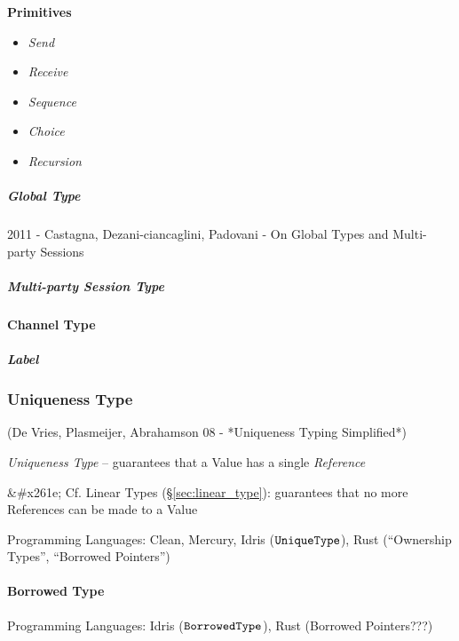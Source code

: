 \textbf{Primitives}

\begin{itemize}
  \item \emph{Send}
  \item \emph{Receive}
  \item \emph{Sequence}
  \item \emph{Choice}
  \item \emph{Recursion}
\end{itemize}



\subparagraph{Global Type}\label{sec:global_type}\hfill

2011 - Castagna, Dezani-ciancaglini, Padovani - On Global Types and
Multi-party Sessions %



\subparagraph{Multi-party Session Type}
\label{sec:multiparty_session}\hfill



\paragraph{Channel Type}\label{sec:channel_type}\hfill

\subparagraph{Label}\label{sec:channel_label}\hfill



\subsubsection{Uniqueness Type}\label{sec:uniqueness_type}

(De Vries, Plasmeijer, Abrahamson 08 - *Uniqueness Typing Simplified*)

\emph{Uniqueness Type} -- guarantees that a Value has a single
\emph{Reference}

&#x261e; Cf. Linear Types (\S\ref{sec:linear_type}): guarantees that
no more References can be made to a Value

Programming Languages: Clean, Mercury, Idris ($\mathtt{UniqueType}$), Rust
(``Ownership Types'', ``Borrowed Pointers'')



\paragraph{Borrowed Type}\label{sec:channel_type}\hfill

Programming Languages: Idris ($\mathtt{BorrowedType}$), Rust (Borrowed
Pointers???)

